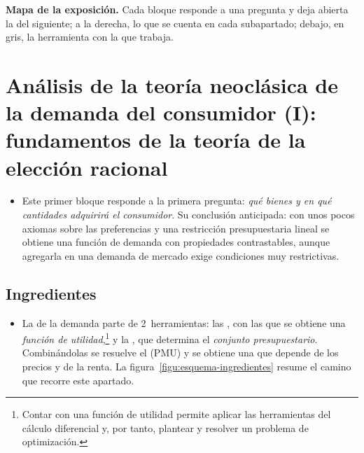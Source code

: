 \documentclass[11pt]{article}
\begin{document}
\begin{anotaciones}
\textbf{Mapa de la exposición.} Cada bloque responde a una pregunta y deja abierta la del siguiente; a la derecha, lo que se cuenta en cada subapartado; debajo, en gris, la herramienta con la que trabaja.
\begin{infografiacaja}
\caption{Mapa del tema: la pregunta de cada bloque, sus subapartados y el hilo que los une}\label{figu:mapa-tema}
\end{infografiacaja}
\end{anotaciones}



\section{Análisis de la teoría neoclásica de la demanda\cortetitulo{} del consumidor (I): fundamentos de la teoría\cortetitulo{} de la elección racional}\label{sec:analisis-teoria-neoclasica}

\begin{itemize}
\item Este primer bloque responde a la primera pregunta: \emph{qué bienes y en qué cantidades adquirirá el consumidor}. Su conclusión anticipada: con unos pocos axiomas sobre las preferencias y una restricción presupuestaria lineal se obtiene una función de demanda con propiedades contrastables, aunque agregarla en una demanda de mercado exige condiciones muy restrictivas.
\end{itemize}

\subsection{Ingredientes}\label{sec:ingredientes}

\begin{itemize}
\item La  de la demanda parte de 2~herramientas: las , con las que se obtiene una \emph{función de utilidad},\footnote{Contar con una función de utilidad permite aplicar las herramientas del cálculo diferencial y, por tanto, plantear y resolver un problema de optimización.} y la , que determina el \emph{conjunto presupuestario}. Combinándolas se resuelve el  (PMU) y se obtiene una  que depende de los precios y de la renta. La figura~\ref{figu:esquema-ingredientes} resume el camino que recorre este apartado.
\end{itemize}
\end{document}
